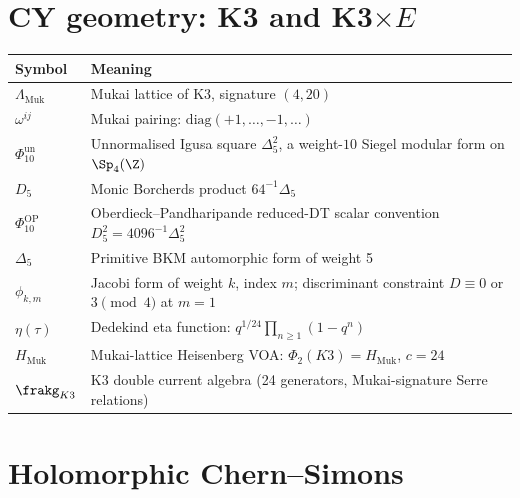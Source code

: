 \section{CY geometry: K3 and K3\texorpdfstring{$\times E$}{x E}}
\label{sec:nc-k3}

\begin{center}
\begin{tabular}{@{}lp{8cm}@{}}
\toprule
\textbf{Symbol} & \textbf{Meaning} \\
\midrule
$\Lambda_{\mathrm{Muk}}$ & Mukai lattice of K3, signature $(4,20)$ \\
$\omega^{ij}$ & Mukai pairing: $\mathrm{diag}(+1,\ldots,-1,\ldots)$ \\
$\Phi_{10}^{\mathrm{un}}$ & Unnormalised Igusa square
 $\Delta_5^2$, a weight-$10$ Siegel modular form on $\Sp_4(\Z)$ \\
$D_5$ & Monic Borcherds product $64^{-1}\Delta_5$ \\
$\Phi_{10}^{\mathrm{OP}}$ & Oberdieck--Pandharipande reduced-DT scalar
 convention $D_5^2=4096^{-1}\Delta_5^2$ \\
$\Delta_5$ & Primitive BKM automorphic form of weight 5 \\
$\phi_{k,m}$ & Jacobi form of weight $k$, index $m$;
 discriminant constraint $D \equiv 0$ or $3 \pmod{4}$ at $m = 1$ \\
$\eta(\tau)$ & Dedekind eta function: $q^{1/24}\prod_{n \ge 1}(1 - q^n)$ \\
$H_{\mathrm{Muk}}$ & Mukai-lattice Heisenberg VOA:
 $\Phi_2(K3) = H_{\mathrm{Muk}}$, $c = 24$ \\
$\frakg_{K3}$ & K3 double current algebra
 (24 generators, Mukai-signature Serre relations) \\
\bottomrule
\end{tabular}
\end{center}

\section{Holomorphic Chern--Simons}
\label{sec:nc-hcs}

